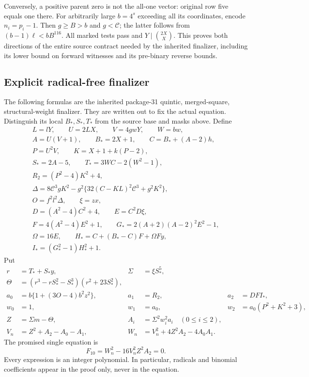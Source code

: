 Conversely, a positive parent zero is not the all-one vector: original
row five equals one there. For arbitrarily large $b=4^s$ exceeding all
its coordinates, encode $n_i=p_i-1$. Then $g\ge B>b$ and $g<\mathcal C$;
the latter follows from $(b-1)\ell<bB^{116}$. All marked tests pass and
$Y\mid\binom{2X}{X}$. This proves both directions of the entire source
contract needed by the inherited finalizer, including its lower bound on
forward witnesses and its pre-binary reverse bounds.

\subsection{Explicit radical-free finalizer}

The following formulas are the inherited package-31 quintic,
merged-square, structural-weight finalizer. They are written out to fix
the actual equation. Distinguish its local $B_*,S_*,T_*$ from the source
base and masks above. Define
\begin{gather*}
 L=lY,\qquad U=2LX,\qquad V=4gwY,\qquad W=bw,\\
 A=U(V+1),\qquad B_*=2X+1,\qquad C=B_*+(A-2)h,\\
 P=U^2V,\qquad K=X+1+k(P-2),\\
 S_*=2A-5,\qquad T_*=3WC-2(W^2-1),\\
 R_2=(P^2-4)K^2+4,\\
 \Delta=8\mathcal C^3gK^2-g^2\{32(C-KL)^2\mathcal C^3+g^2K^2\},\\
 O=f^2l^2\Delta,\qquad \xi=zx,\\
 D=(A^2-4)C^2+4,\qquad E=C^2D\xi,\\
 F=4(A^2-4)E^2+1,\qquad G_*=2(A+2)(A-2)^2E^2-1,\\
 \Omega=16E,\qquad H_*=C+(B_*-C)F+\Omega Fy,\\
 I_*=(G_*^2-1)H_*^2+1.
\end{gather*}
Put
\begin{align*}
 r&=T_*+S_*y,&\Sigma&=\xi S_*^5,\\
 \Theta&=(r^3-rS_*^2-S_*^3)(r^2+23S_*^2),\\
 a_0&=b\{1+(3O-4)b^2z^2\},&a_1&=R_2,&a_2&=DFI_*,\\
 w_0&=1,&w_1&=a_0,&w_2&=a_0(P^2+K^2+3),\\
 Z&=\Sigma m-\Theta,&A_i&=\Sigma^2w_i^2a_i\quad(0\le i\le2),\\
 V_n&=Z^2+A_2-A_0-A_1,&W_n&=V_n^2+4Z^2A_2-4A_0A_1.
\end{align*}
The promised single equation is
\begin{equation}\label{eq:split-final-ten}
 \boxed{\ F_{10}=W_n^2-16V_n^2Z^2A_2=0.\ }
\end{equation}
Every expression is an integer polynomial. In particular, radicals and
binomial coefficients appear in the proof only, never in the equation.

